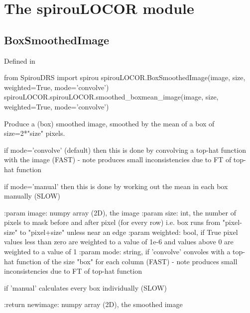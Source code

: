
\clearpage
\newpage
\begin{minipage}{\textwidth}
\section{The spirouLOCOR module}
\label{ch:the_module:spirouLOCOR}

\subsection{BoxSmoothedImage}

Defined in \spirouLOCOR{}

\begin{pythonbox}
from SpirouDRS import spirou
spirouLOCOR.BoxSmoothedImage(image, size, weighted=True, mode='convolve')
spirouLOCOR.spirouLOCOR.smoothed_boxmean_image(image, size, weighted=True, mode='convolve')
\end{pythonbox}

\begin{pythondocstring}
Produce a (box) smoothed image, smoothed by the mean of a box of
    size=2*"size" pixels.

    if mode='convolve' (default) then this is done
    by convolving a top-hat function with the image (FAST)
    - note produces small inconsistencies due to FT of top-hat function

    if mode='manual' then this is done by working out the mean in each
    box manually (SLOW)

:param image: numpy array (2D), the image
:param size: int, the number of pixels to mask before and after pixel
             (for every row)
             i.e. box runs from  "pixel-size" to "pixel+size" unless
             near an edge
:param weighted: bool, if True pixel values less than zero are weighted to
                 a value of 1e-6 and values above 0 are weighted to a value
                 of 1
:param mode: string, if 'convolve' convoles with a top-hat function of the
                     size "box" for each column (FAST) - note produces small
                     inconsistencies due to FT of top-hat function

                     if 'manual' calculates every box individually (SLOW)

:return newimage: numpy array (2D), the smoothed image
\end{pythondocstring}
\end{minipage}


